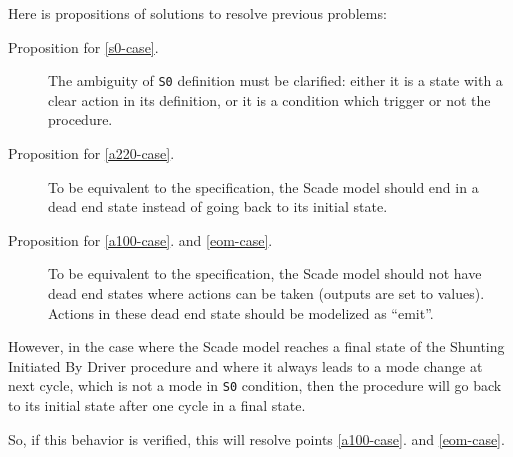 Here is propositions of solutions to resolve previous problems:
\begin{description}
\item[Proposition for \ref{s0-case}.] The ambiguity of \texttt{S0} definition must be
  clarified: either it is a state with a clear action in its
  definition, or it is a condition which trigger or not the procedure.
\item[Proposition for \ref{a220-case}.] To be equivalent to the
  specification, the Scade model should end in a dead end state
  instead of going back to its initial state.
\item[Proposition for \ref{a100-case}. and \ref{eom-case}.] To be
  equivalent to the specification, the Scade model should not have
  dead end states where actions can be taken (outputs are set to
  values). Actions in these dead end state should be modelized as
  ``emit''.
\end{description}


However, in the case where the Scade model reaches a final state of
the Shunting Initiated By Driver procedure and where it always leads
to a mode change at next cycle, which is not a mode in \texttt{S0}
condition, then the procedure will go back to its initial state after
one cycle in a final state.

So, if this behavior is verified, this will resolve points
\ref{a100-case}. and \ref{eom-case}.







